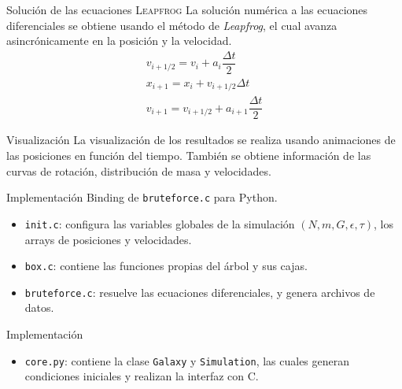 \documentclass[handout]{beamer}
\begin{document}
\begin{frame}{Soluci\'on de las ecuaciones}
	{\scshape Leapfrog}
	La soluci\'on num\'erica a las ecuaciones diferenciales se obtiene usando el m\'etodo de \textit{Leapfrog}, el cual avanza asincr\'onicamente en la posici\'on y la velocidad.
	\begin{equation}
		\begin{matrix}
			v_{i+1/2} = v_i + a_i\dfrac{\Delta t}{2}\\
			x_{i+1} = x_i + v_{i+1/2}\Delta t \\
			v_{i+1} = v_{i+1/2}+a_{i+1}\dfrac{\Delta t}{2}
		\end{matrix}
	\end{equation}
\end{frame}

\begin{frame}{Visualizaci\'on}
	La visualizaci\'on de los resultados se realiza usando animaciones de las posiciones en funci\'on del tiempo. Tambi\'en se obtiene informaci\'on de las curvas de rotaci\'on, distribuci\'on de masa y velocidades.
\end{frame}
\begin{frame}{Implementaci\'on}
	Binding de \texttt{bruteforce.c} para Python.
	\begin{tcolorbox}[colback=green!5,colframe=green!40!black,title=C Programming Language]
		\begin{itemize}
			\item \texttt{init.c}: configura las variables globales de la simulaci\'on $(N, m, G, \epsilon, \tau)$, los arrays de posiciones y velocidades.
			\item \texttt{box.c}: contiene las funciones propias del \'arbol y sus cajas.
			\item \texttt{bruteforce.c}: resuelve las ecuaciones diferenciales, y genera archivos de datos.
		\end{itemize}
	\end{tcolorbox}
\end{frame}
\begin{frame}{Implementaci\'on}
	\begin{tcolorbox}[colback=blue!5,colframe=blue!40!black,title=Python]
		\begin{itemize}
			\item \texttt{core.py}: contiene la clase \texttt{Galaxy} y \texttt{Simulation}, las cuales generan condiciones iniciales y realizan la interfaz con C.
		\end{itemize}
	\end{tcolorbox}
\end{frame}
\end{document}
